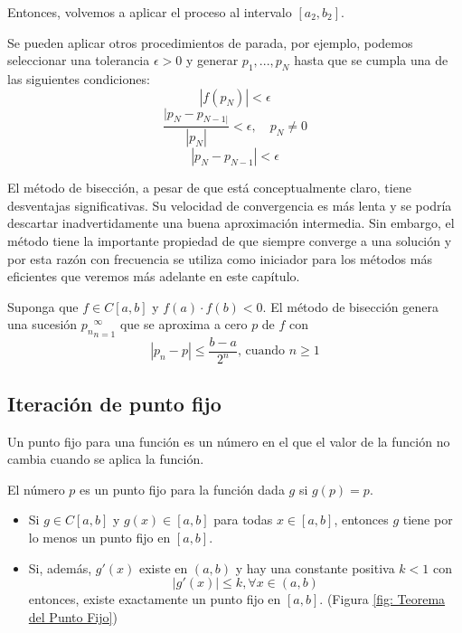 Entonces, volvemos a aplicar el proceso al intervalo $[a_2, b_2]$.

Se pueden aplicar otros procedimientos de parada, por ejemplo, podemos seleccionar una tolerancia $\epsilon > 0$ y generar $p_1, ..., p_N$ hasta que se cumpla una de las siguientes condiciones:
\begin{equation}
    |f(p_N)| < \epsilon
\end{equation}
\begin{equation}
    \frac{|p_N - p_{N-1|}}{|p_N|} < \epsilon, \quad p_N \neq 0
\end{equation}
\begin{equation}
    |p_N - p_{N-1}| < \epsilon
\end{equation}

El método de bisección, a pesar de que está conceptualmente claro, tiene desventajas significativas. Su velocidad de convergencia es más lenta y se podría descartar inadvertidamente una buena aproximación intermedia. Sin embargo, el método tiene la importante propiedad de que siempre converge a una solución y por esta razón con frecuencia se utiliza como iniciador para los métodos más eficientes que veremos más adelante en este capítulo.

\begin{theorem}
    Suponga que $f \in C[a, b]$ y $f(a) \cdot f(b) < 0$. El método de bisección genera una sucesión ${p_n}_{n = 1}^\infty$ que se aproxima a cero $p$ de $f$ con
    \[ |p_n - p| \leq \frac{b - a}{2^n} \text{, cuando } n \geq  1\]
\end{theorem}

\subsection{Iteración de punto fijo}
Un punto fijo para una función es un número en el que el valor de la función no cambia cuando se aplica la función.

\begin{definition}
    El número $p$ es un punto fijo para la función dada $g$ si $g(p) = p$.
\end{definition}

\begin{theorem}
    \begin{itemize}
        \item Si $g \in C[a, b]$ y $g(x) \in [a, b]$ para todas $x \in [a, b]$, entonces $g$ tiene por lo menos un punto fijo en $[a, b]$.
        \item Si, además, $g'(x)$ existe en $(a, b)$ y hay una constante positiva $k < 1$ con 
        \[ |g'(x)| \leq k, \forall x \in (a, b) \]
        entonces, existe exactamente un punto fijo en $[a, b]$. (Figura \ref{fig: Teorema del Punto Fijo})
    \end{itemize}
\end{theorem}

